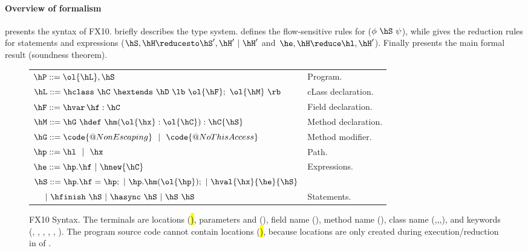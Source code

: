 \paragraph{Overview of formalism}
 presents the syntax of FX10.
 briefly describes the type
system.  defines the flow-sensitive rules for
    ($\phi~\hS~\psi$), while
     gives the reduction rules for statements
    and expressions ($\hS,\hH \reducesto \hS',\hH' ~|~\hH'$
    and~$\he,\hH \reduce \hl,\hH'$). Finally 
    presents the main formal result (soundness theorem).



\begin{figure}[htpb!]
\begin{center}
\begin{tabular}{|l|l|}
\hline

$\hP ::= \ol{\hL},\hS$ & Program. \\

$\hL ::= \hclass ~ \hC~\hextends~\hD~\lb~\ol{\hF};~\ol{\hM}~\rb$
& cLass declaration. \\

$\hF ::= \hvar\,\hf:\hC$
& Field declaration. \\

$\hM ::= \hG\ \hdef\ \hm(\ol{\hx}:\ol{\hC}):\hC\{\hS\}$
& Method declaration. \\

$\hG ::= \code{@NonEscaping} ~~|~~ \code{@NoThisAccess}$
& Method modifier. \\

$\hp ::= \hl ~~|~~ \hx$
& Path. \\ %

$\he ::=  \hp.\hf  ~|~ \hnew{\hC}$
& Expressions. \\ %

$\hS ::=  \hp.\hf = \hp; ~|~ \hp.\hm(\ol{\hp});  ~|~ \hval{\hx}{\he}{\hS}$ &\\
$~~~~|~ \hfinish~\hS~|~ \hasync~\hS ~|~ \hS\ \hS$
& Statements. \\ %

\hline
\end{tabular}
\end{center}
\caption{FX10 Syntax.
    The terminals are locations (\hl), parameters and \hthis (\hx), field name (\hf), method name (\hm), class name (\hB,\hC,\hD,\hObject),
        and keywords (\hescaping, \nonescaping, \hhnew, \finish, \async, ).
    The program source code cannot contain locations (\hl), because locations are only created during execution/reduction in  of .
    }
\label{Figure:syntax}
\end{figure}

